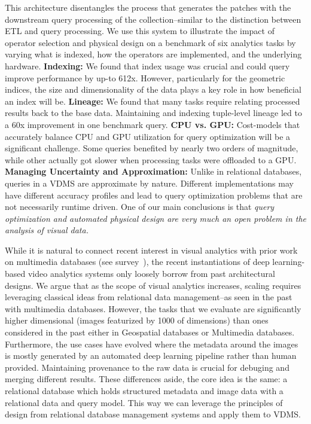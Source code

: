 This architecture disentangles the process that generates the patches with the downstream query processing of the collection--similar to the distinction between ETL and query processing.
We use this system to illustrate the impact of operator selection and physical design on a benchmark of six analytics tasks by varying what is indexed, how the operators are implemented, and the underlying hardware.
\textbf{Indexing: }We found that index usage was crucial and could query improve performance by up-to 612x. However, particularly for the geometric indices, the size and dimensionality of the data plays a key role in how beneficial an index will be.
\textbf{Lineage: }We found that many tasks require relating processed results back to the base data.
Maintaining and indexing tuple-level lineage led to a 60x improvement in one benchmark query.
\textbf{CPU vs. GPU: }Cost-models that accurately balance CPU and GPU utilization for query optimization will be a significant challenge. Some queries benefited by nearly two orders of magnitude, while other actually got slower when processing tasks were offloaded to a GPU.
\textbf{Managing Uncertainty and Approximation: }Unlike in relational databases, queries in a VDMS are approximate by nature. Different implementations may have different accuracy profiles and lead to query optimization problems that are not necessarily runtime driven.
One of our main conclusions is that \emph{query optimization and automated physical design are very much an open problem in the analysis of visual data.}


While it is natural to connect recent interest in visual analytics with prior work on multimedia databases (see survey~\cite{yoshitaka1999survey}), the recent instantiations of deep learning-based video analytics systems only loosely borrow from past architectural designs.
We argue that as the scope of visual analytics increases, scaling requires leveraging classical ideas from relational data management--as seen in the past with multimedia databases.
However, the tasks that we evaluate are significantly higher dimensional (images featurized by 1000 of dimensions) than ones considered in the past either in Geospatial databases or Multimedia databases.
Furthermore, the use cases have evolved where the metadata around the images is mostly generated by an automated deep learning pipeline rather than human provided.
Maintaining provenance to the raw data is crucial for debuging and merging different results. 
These differences aside, the core idea is the same: a relational database which holds structured metadata and image data with a relational data and query model. 
This way we can leverage the principles of design from relational database management systems and apply them to VDMS.











